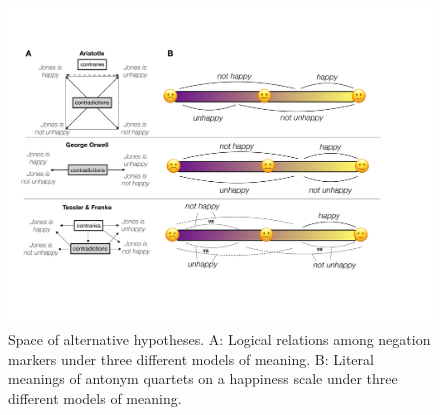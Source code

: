 \documentclass[floatsintext,doc]{apa6}
\begin{document}



\begin{figure}[t]
\centering\includegraphics{figs/happy-scale3}
\caption{Space of alternative hypotheses. A: Logical relations among negation markers under three different models of meaning. B: Literal meanings of antonym quartets on a happiness scale under three different models of meaning. }\label{fig:happy-scale}
\end{figure}
\end{document}
